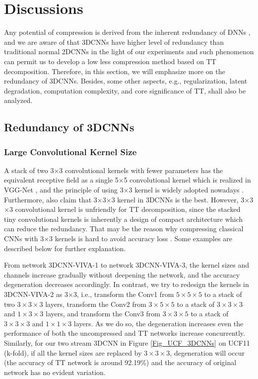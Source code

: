 \documentclass[a4paper,fleqn]{cas-dc}
\begin{document}
\section{Discussions}\label{sec:Dis}

Any potential of compression is derived from the inherent redundancy of DNNs \citep{Denil_2013_Redundancy}, and we are aware of that 3DCNNs have higher level of redundancy than traditional normal 2DCNNs in the light of our experiments and such phenomenon can permit us to develop a low less compression method based on TT decomposition. Therefore, in this section, we will emphasize more on the redundancy of 3DCNNs. Besides, some other aspects, e.g., regularization, latent degradation, computation complexity, and core significance of TT, shall also be analyzed.

\subsection{Redundancy of 3DCNNs}

\subsubsection{Large Convolutional Kernel Size}\quad

A stack of two 3\(\times\)3 convolutional kernels with fewer parameters has the equivalent receptive field as a single 5\(\times\)5 convolutional kernel which is realized in VGG-Net \citep{Simonyan_2015_VGG}, and the principle of using 3\(\times\)3 kernel is widely adopted nowadays \citep{He_2016_ResNet,Huang_2017_DenseNet}. Furthermore, \citet{Tran_2015_3DCNN} also claim that 3\(\times\)3\(\times\)3 kernel in 3DCNNs is the best. However, 3\(\times\)3\(\times\)3 convolutional kernel is unfriendly for TT decomposition, since the stacked tiny convolutional kernels is inherently a design of compact architecture which can reduce the redundancy. That may be the reason why compressing classical CNNs with 3\(\times\)3 kernels is hard to avoid accuracy loss \citep{Garipov_2016_TTCNN}. Some examples are described below for further explanation.

From network 3DCNN-VIVA-1 to network 3DCNN-VIVA-3, the kernel sizes and channels increase gradually without deepening the network, and the accuracy degeneration decreases accordingly. In contrast, we try to redesign the kernels in 3DCNN-VIVA-2 as 3\(\times\)3, i.e., transform the Conv1 from \(5 \times 5 \times 5\) to a stack of two \(3 \times 3 \times 3\) layers, transform the Conv2 from \(3 \times 5 \times 5\) to a stack of \(3 \times 3 \times 3\) and \(1 \times 3 \times 3\) layers, and transform the Conv3 from \(3 \times 3 \times 5\) to a stack of \(3 \times 3 \times 3\) and \(1 \times 1 \times 3\) layers. As we do so, the degeneration increases even the performance of both the uncompressed and TT networks increase concurrently. Similarly, for our two stream 3DCNN in Figure \ref{Fig_UCF_3DCNNs} on UCF11 (k-fold), if all the kernel sizes are replaced by \(3 \times 3 \times 3\), degeneration will occur (the accuracy of TT network is around 92.19\%) and the accuracy of original network has no evident variation.
\end{document}
